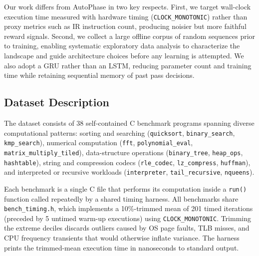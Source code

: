 \documentclass[conference]{IEEEtran}
\begin{document}
Our work differs from AutoPhase in two key respects.  First, we target
wall-clock execution time measured with hardware timing (\texttt{CLOCK\_MONOTONIC})
rather than proxy metrics such as IR instruction count, producing noisier but
more faithful reward signals.  Second, we collect a large offline corpus of
random sequences prior to training, enabling systematic exploratory data
analysis to characterize the landscape and guide architecture choices before
any learning is attempted.  We also adopt a GRU rather than an LSTM, reducing
parameter count and training time while retaining sequential memory of past
pass decisions.

\subsection{Dataset Description}

The dataset consists of 38 self-contained C benchmark programs spanning
diverse computational patterns: sorting and searching
(\texttt{quicksort}, \texttt{binary\_search}, \texttt{kmp\_search}), numerical
computation (\texttt{fft}, \texttt{polynomial\_eval},
\texttt{matrix\_multiply\_tiled}), data-structure operations
(\texttt{binary\_tree}, \texttt{heap\_ops}, \texttt{hashtable}), string and
compression codecs (\texttt{rle\_codec}, \texttt{lz\_compress},
\texttt{huffman}), and interpreted or recursive workloads
(\texttt{interpreter}, \texttt{tail\_recursive}, \texttt{nqueens}).

Each benchmark is a single C file that performs its computation inside a
\texttt{run()} function called repeatedly by a shared timing harness.  All
benchmarks share \texttt{bench\_timing.h}, which implements a 10\%-trimmed
mean of 201 timed iterations (preceded by 5 untimed warm-up executions) using
\texttt{CLOCK\_MONOTONIC}.  Trimming the extreme deciles discards outliers
caused by OS page faults, TLB misses, and CPU frequency transients that would
otherwise inflate variance.  The harness prints the trimmed-mean execution
time in nanoseconds to standard output.
\end{document}

